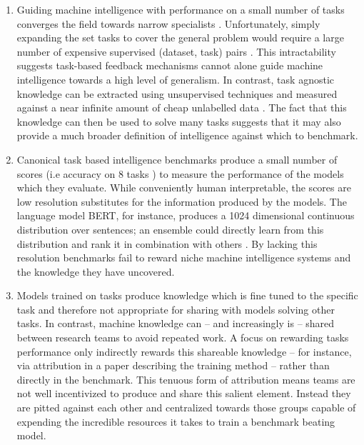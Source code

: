 \documentclass{article}
\begin{document}
\begin{enumerate}
	\item Guiding machine intelligence with performance on a  small number of tasks converges the field towards narrow specialists \cite{chollet2019measure}. Unfortunately, simply expanding the set tasks to cover the general problem would require a large number of expensive supervised (dataset, task) pairs \cite{radford2019language}. This intractability suggests task-based feedback mechanisms cannot alone guide machine intelligence towards a high level of generalism. In contrast, task agnostic knowledge can be extracted using unsupervised techniques and measured against a near infinite amount of cheap unlabelled data \cite{devlin2018bert}. The fact that this knowledge can then be used to solve many tasks \cite{radford2019language} suggests that it may also provide a much broader definition of intelligence against which to benchmark. 
	
	\item Canonical task based intelligence benchmarks produce a small number of scores (i.e accuracy on 8 tasks \cite{wang2019superglue}) to measure the performance of the models which they evaluate. While conveniently human interpretable, the scores are low resolution substitutes for the information produced by the models. The language model BERT, for instance, produces a 1024 dimensional continuous distribution over sentences; an ensemble could directly learn from this distribution and rank it in combination with others \cite{shazeer2017outrageously}. By lacking this resolution benchmarks fail to reward niche machine intelligence systems and the knowledge they have uncovered.
	
	\item Models trained on tasks produce knowledge which is fine tuned to the  specific task and therefore not appropriate for sharing with models solving other tasks. In contrast, machine knowledge can -- and increasingly is \cite{Sanh2019DistilBERT} -- shared between research teams to avoid repeated work. A focus on rewarding tasks performance only indirectly rewards this shareable knowledge -- for instance, via attribution in a paper describing the training method -- rather than directly in the benchmark. This tenuous form of attribution means teams are not well incentivized to produce and share this salient element. Instead they are pitted against each other and centralized towards those groups capable of expending the incredible resources it takes to train a benchmark beating model.
\end{enumerate}
\end{document}
